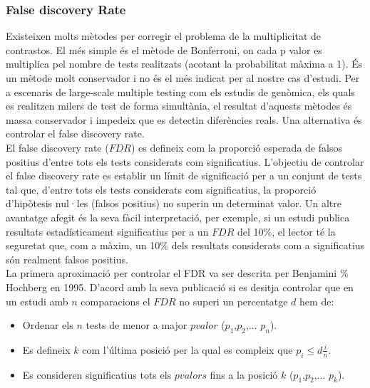 \documentclass[english]{article}
\begin{document}
\subsubsection{False discovery Rate}
Existeixen molts mètodes per corregir el problema de la multiplicitat de contrastos. El més simple és el mètode de Bonferroni, on cada p valor es multiplica pel nombre de tests realitzats (acotant la probabilitat màxima a 1). És un mètode molt conservador i no és el més indicat per al nostre cas d'estudi.
Per a escenaris de large-scale multiple testing com els estudis de genòmica, els quals es realitzen milers de test de forma simultània, el resultat d'aquests mètodes és massa conservador i impedeix que es detectin diferències reals. Una alternativa és controlar el false discovery rate.
\\

El false discovery rate ($FDR$) es defineix com la proporció esperada de falsos positius d'entre tots els tests considerats com significatius. L'objectiu de controlar el false discovery rate es establir un límit de significació per a un conjunt de tests tal que, d'entre tots els tests considerats com significatius, la proporció d'hipòtesis nul·les (falsos positius) no superin un determinat valor.
Un altre avantatge afegit és la seva fàcil interpretació, per exemple, si un estudi publica resultats estadísticament significatius per a un $FDR$ del 10$\%$, el lector té la seguretat que, com a màxim, un 10$\%$ dels resultats considerats com a significatius són realment falsos positius.
\\
La primera aproximació per controlar el FDR va ser descrita per Benjamini $\%$ Hochberg en 1995. D'acord amb la seva publicació si es desitja controlar que en un estudi amb $n$ comparacions el $FDR$ no superi un percentatge $d$ hem de:

\begin{itemize}
\item Ordenar els $n$ tests de menor a major $pvalor$ ($p_{1}$,$p_{2}$,... $p_n$).
\item Es defineix $k$ com l'última posició per la qual es compleix que $p_i \leq d\frac{i}{n}$.
\item Es consideren significatius tots els $pvalors$ fins a la posició $k$ ($p_{1}$,$p_{2}$,... $p_k$).

\end{itemize}
\end{document}

